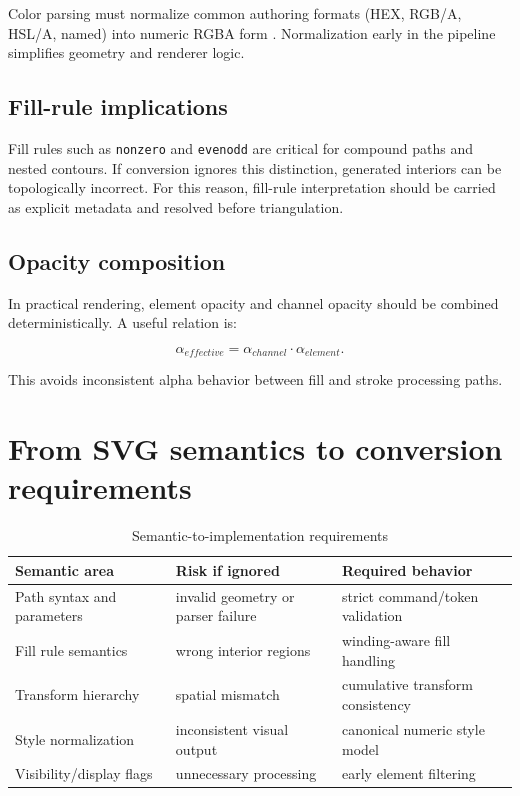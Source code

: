 Color parsing must normalize common authoring formats (HEX, RGB/A, HSL/A, named) into numeric RGBA form \cite{mdn_svg}.
Normalization early in the pipeline simplifies geometry and renderer logic.

\subsection{Fill-rule implications}

Fill rules such as \texttt{nonzero} and \texttt{evenodd} are critical for compound paths and nested contours.
If conversion ignores this distinction, generated interiors can be topologically incorrect.
For this reason, fill-rule interpretation should be carried as explicit metadata and resolved before triangulation.

\subsection{Opacity composition}

In practical rendering, element opacity and channel opacity should be combined deterministically.
A useful relation is:

\begin{equation}
\alpha_{effective} = \alpha_{channel} \cdot \alpha_{element}.
\label{eq:alpha_effective}
\end{equation}

This avoids inconsistent alpha behavior between fill and stroke processing paths.

\section{From SVG semantics to conversion requirements}

\begin{table}[htbp]
\centering
\caption{Semantic-to-implementation requirements}
\label{tab:svg_semantic_requirements}
\begin{tabular}{>{\raggedright\arraybackslash}p{4.0cm} >{\raggedright\arraybackslash}p{4.8cm} >{\raggedright\arraybackslash}p{4.6cm}}
\toprule
\textbf{Semantic area} & \textbf{Risk if ignored} & \textbf{Required behavior} \\
\midrule
Path syntax and parameters & invalid geometry or parser failure & strict command/token validation \\
Fill rule semantics & wrong interior regions & winding-aware fill handling \\
Transform hierarchy & spatial mismatch & cumulative transform consistency \\
Style normalization & inconsistent visual output & canonical numeric style model \\
Visibility/display flags & unnecessary processing & early element filtering \\
\bottomrule
\end{tabular}
\end{table}

